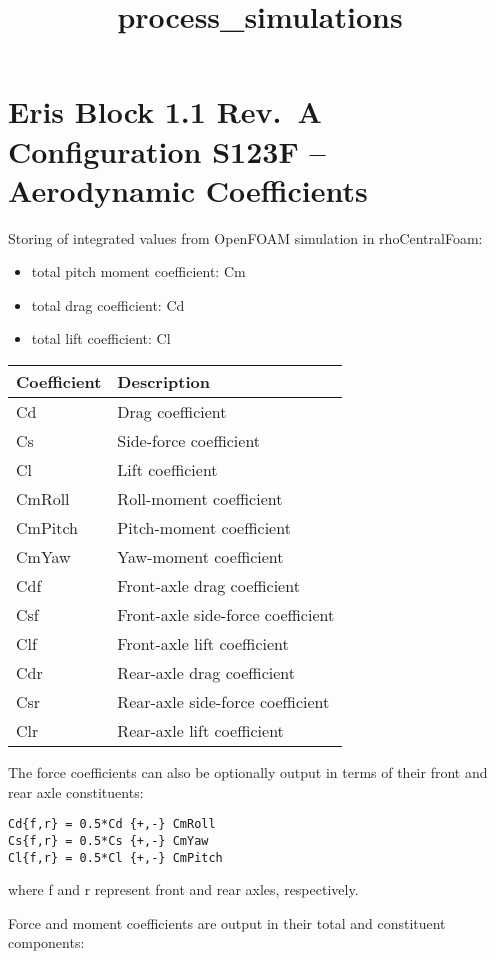 \documentclass[11pt]{article}
\title{process\_simulations}
\providecommand{\tightlist}{%
      \setlength{\itemsep}{0pt}\setlength{\parskip}{0pt}}
\begin{document}
    
    \maketitle
    
    

    
    \hypertarget{eris-block-1.1-rev.-a-configuration-s123f-aerodynamic-coefficients}{%
\section{Eris Block 1.1 Rev.~A Configuration S123F -- Aerodynamic
Coefficients}\label{eris-block-1.1-rev.-a-configuration-s123f-aerodynamic-coefficients}}

    Storing of integrated values from OpenFOAM simulation in rhoCentralFoam:

\begin{itemize}
\tightlist
\item
  total pitch moment coefficient: Cm
\item
  total drag coefficient: Cd
\item
  total lift coefficient: Cl
\end{itemize}

\begin{longtable}[]{@{}ll@{}}
\toprule
Coefficient & Description\tabularnewline
\midrule
\endhead
Cd & Drag coefficient\tabularnewline
Cs & Side-force coefficient\tabularnewline
Cl & Lift coefficient\tabularnewline
CmRoll & Roll-moment coefficient\tabularnewline
CmPitch & Pitch-moment coefficient\tabularnewline
CmYaw & Yaw-moment coefficient\tabularnewline
Cdf & Front-axle drag coefficient\tabularnewline
Csf & Front-axle side-force coefficient\tabularnewline
Clf & Front-axle lift coefficient\tabularnewline
Cdr & Rear-axle drag coefficient\tabularnewline
Csr & Rear-axle side-force coefficient\tabularnewline
Clr & Rear-axle lift coefficient\tabularnewline
\bottomrule
\end{longtable}

The force coefficients can also be optionally output in terms of their
front and rear axle constituents:

\begin{verbatim}
Cd{f,r} = 0.5*Cd {+,-} CmRoll
Cs{f,r} = 0.5*Cs {+,-} CmYaw
Cl{f,r} = 0.5*Cl {+,-} CmPitch
\end{verbatim}

where f and r represent front and rear axles, respectively.

Force and moment coefficients are output in their total and constituent
components:
\end{document}
